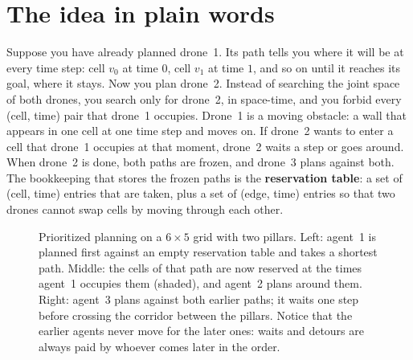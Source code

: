 \section{The idea in plain words}
\label{sec:ch08-intuition}

Suppose you have already planned drone~1. Its path tells you where it will be at every
time step: cell $v_0$ at time $0$, cell $v_1$ at time $1$, and so on until it reaches
its goal, where it stays. Now you plan drone~2. Instead of searching the joint space of
both drones, you search only for drone~2, in space-time, and you forbid every
(cell, time) pair that drone~1 occupies. Drone~1 is a moving obstacle: a wall that
appears in one cell at one time step and moves on. If drone~2 wants to enter a cell
that drone~1 occupies at that moment, drone~2 waits a step or goes around. When drone~2
is done, both paths are frozen, and drone~3 plans against both. The bookkeeping that
stores the frozen paths is the \textbf{reservation table}: a
set of (cell, time) entries that are taken, plus a set of (edge, time) entries so that
two drones cannot swap cells by moving through each other.

\begin{figure}[tb]
  \centering
  \caption{Prioritized planning on a $6 \times 5$ grid with two pillars. Left: agent~1
  is planned first against an empty reservation table and takes a shortest path. Middle:
  the cells of that path are now reserved at the times agent~1 occupies them (shaded),
  and agent~2 plans around them. Right: agent~3 plans against both earlier paths; it
  waits one step before crossing the corridor between the pillars. Notice that the
  earlier agents never move for the later ones: waits and detours are always paid by
  whoever comes later in the order.}
  \label{fig:ch08-idea}
\end{figure}

